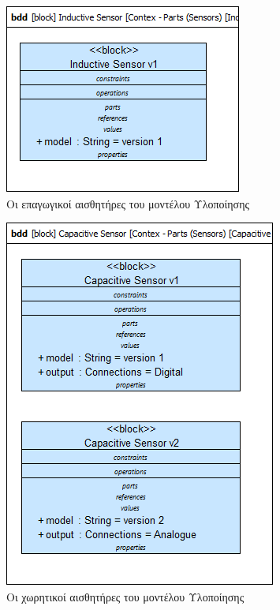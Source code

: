 \documentclass[a4paper,12pt,twoside]{report}
\begin{document}
\begin{appendices}
				\begin{figure}[hp]
					\centering
					\includegraphics[scale=0.50]{DesignModel_Contex-Parts(Sensors)[InductiveSensor].png}
					\caption{Οι επαγωγικοί αισθητήρες του μοντέλου Υλοποίησης}
					\label{φωτ:Οι επαγωγικοί αισθητήρες του μοντέλου Υλοποίησης}
				\end{figure}
				
				\begin{figure}[hp]
					\centering
					\includegraphics[scale=0.50]{DesignModel_Contex-Parts(Sensors)[CapacitiveSensors].png}
					\caption{Οι χωρητικοί αισθητήρες του μοντέλου Υλοποίησης}
					\label{φωτ:Οι χωρητικοί αισθητήρες του μοντέλου Υλοποίησης}
				\end{figure}
				

\end{appendices}
\end{document}
